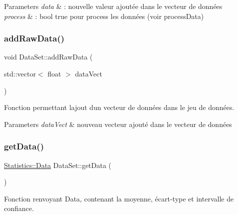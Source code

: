 \begin{DoxyParams}{Parameters}
{\em data} & \+: nouvelle valeur ajoutée dans le vecteur de données \\
\hline
{\em process} & \+: bool true pour process les données (voir process\+Data) \\
\hline
\end{DoxyParams}
\mbox{\label{classDataSet_a71cfe353100966c9bdfb1f6880075691}} 
\subsubsection{\texorpdfstring{add\+Raw\+Data()}{addRawData()}\hspace{0.1cm}{\footnotesize\ttfamily [2/2]}}
{\footnotesize\ttfamily void Data\+Set\+::add\+Raw\+Data (\begin{DoxyParamCaption}\item[{std\+::vector$<$ float $>$}]{data\+Vect }\end{DoxyParamCaption})}



Fonction permettant l\textquotesingle{}ajout d\textquotesingle{}un vecteur de données dans le jeu de données. 


\begin{DoxyParams}{Parameters}
{\em data\+Vect} & nouveau vecteur ajouté dans le vecteur de données \\
\hline
\end{DoxyParams}
\mbox{\label{classDataSet_af646e5b745734c1b18f2e90117e1d3c1}} 
\subsubsection{\texorpdfstring{get\+Data()}{getData()}}
{\footnotesize\ttfamily \hyperlink{structStatistics_1_1Data}{Statistics\+::\+Data} Data\+Set\+::get\+Data (\begin{DoxyParamCaption}{ }\end{DoxyParamCaption})}



Fonction renvoyant Data, contenant la moyenne, écart-\/type et intervalle de confiance. 

\mbox{\label{classDataSet_a29e3936319d5b2fda4f74b033c556766}} 
